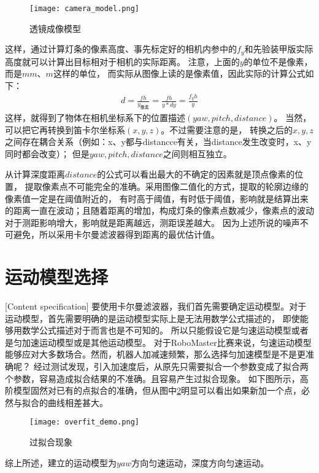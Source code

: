 \begin{figure}[H]
    \centering
    \texttt{[image: camera\_model.png]} 
    \caption{透镜成像模型}
    \label{透镜成像模型} 
\end{figure}    
这样，通过计算灯条的像素高度、事先标定好的相机内参中的$f_y$和先验装甲版实际高度就可以计算出目标相对于相机的实际距离。
注意，上面的$y$的单位不是像素，而是$mm$、$m$这样的单位，
而实际从图像上读的是像素值，因此实际的计算公式如下：
\begin{gather}
    d=\frac{fh}{y_{像素}}=\frac{fh}{y*dy}=\frac{f_yh}{y}
\end{gather}
这样，就得到了物体在相机坐标系下的位置描述$(yaw,pitch, distance)$。
当然，可以把它再转换到笛卡尔坐标系$(x,y,z)$。不过需要注意的是，
转换之后的$x,y,z$之间存在耦合关系（例如：x、y都与distancce有关，当distance发生改变时，x、y同时都会改变）；
但是$yaw,pitch,distance$之间则相互独立。\par

从计算深度距离$distance$的公式可以看出最大的不确定的因素就是顶点像素的位置，
提取像素点不可能完全的准确。采用图像二值化的方式，提取的轮廓边缘的像素值一定是在阈值附近的，
有时高于阈值，有时低于阈值，影响就是结算出来的距离一直在波动；且随着距离的增加，构成灯条的像素点数减少，像素点的波动对于测距影响增大，影响就是距离越远，测距误差越大。
因为上述所说的噪声不可避免，所以采用卡尔曼滤波器得到距离的最优估计值。\par

\section{运动模型选择}[Content specification]
要使用卡尔曼滤波器，我们首先需要确定运动模型。对于运动模型，首先需要明确的是运动模型实际上是无法用数学公式描述的，
即使能够用数学公式描述对于而言也是不可知的。 所以只能假设它是匀速运动模型或者是匀加速运动模型或是其他运动模型。
对于RoboMaster比赛来说，匀速运动模型能够应对大多数场合。然而，机器人加减速频繁，那么选择匀加速模型是不是更准确呢？ 
经过测试发现，引入加速度后，从原先只需要拟合一个参数变成了拟合两个参数，容易造成拟合结果的不准确。且容易产生过拟合现象。
如下图所示，高阶模型固然对已有的点拟合的准确，但从图中\ref{过拟合现象}明显可以看出如果新加一个点，必然与拟合的曲线相差甚大。
\begin{figure}[H]
    \centering
    \texttt{[image: overfit\_demo.png]} 
    \caption{过拟合现象} 
    \label{过拟合现象} 
\end{figure} 

综上所述，建立的运动模型为$yaw$方向匀速运动，深度方向匀速运动。

